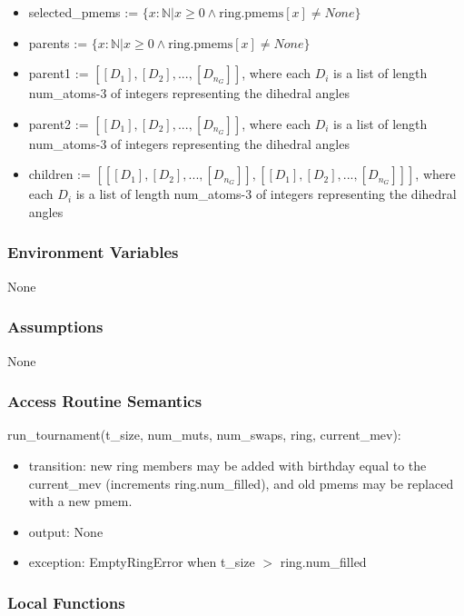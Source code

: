 \documentclass[12pt, titlepage]{article}
\begin{document}
\begin{itemize}
\item selected\_pmems := $\{x : \mathbb{N} | x \geq 0 \land 
\text{ring.pmems}[x] \neq None\}$
\item parents := $\{x : \mathbb{N} | x \geq 0 \land \text{ring.pmems}[x] \neq 
None\}$
\item parent1 := $[[D_1], [D_2], ..., [D_{n_G}]]$, where each 
$D_i$ is a list of length num\_atoms-3 of integers representing the dihedral 
angles
\item parent2 := $[[D_1], [D_2], ..., [D_{n_G}]]$, where each 
$D_i$ is a list of length num\_atoms-3 of integers representing the dihedral 
angles
\item children := $[[[D_1], [D_2], ..., [D_{n_G}]], [[D_1], [D_2], ..., 
[D_{n_G}]]]$, where each $D_i$ is a list of length num\_atoms-3 of integers 
representing the dihedral 
angles
\end{itemize}


\subsubsection{Environment Variables}

None

\subsubsection{Assumptions}

None 

\subsubsection{Access Routine Semantics}

\noindent run\_tournament(t\_size, num\_muts, num\_swaps, ring, current\_mev):
\begin{itemize}
	\item transition: new ring members may be added with birthday equal to the 
	current\_mev (increments ring.num\_filled), and old pmems may be replaced 
	with a new pmem.
	\item output: None 
	\item exception: EmptyRingError when t\_size $>$ ring.num\_filled
\end{itemize}

\subsubsection{Local Functions}
\end{document}
